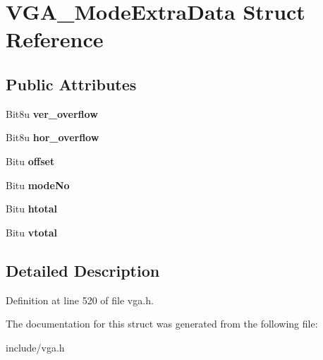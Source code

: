\hypertarget{structVGA__ModeExtraData}{\section{V\-G\-A\-\_\-\-Mode\-Extra\-Data Struct Reference}
\label{structVGA__ModeExtraData}
}
\subsection*{Public Attributes}
\begin{DoxyCompactItemize}
\item 
\hypertarget{structVGA__ModeExtraData_a020b5a995f7d52935b5e4fb5899fe72d}{Bit8u {\bfseries ver\-\_\-overflow}}\label{structVGA__ModeExtraData_a020b5a995f7d52935b5e4fb5899fe72d}

\item 
\hypertarget{structVGA__ModeExtraData_a60204db357ea608c5f03a8d59c80d3ff}{Bit8u {\bfseries hor\-\_\-overflow}}\label{structVGA__ModeExtraData_a60204db357ea608c5f03a8d59c80d3ff}

\item 
\hypertarget{structVGA__ModeExtraData_a11bba06bf4bcd5cb9aca1442e5d9b368}{Bitu {\bfseries offset}}\label{structVGA__ModeExtraData_a11bba06bf4bcd5cb9aca1442e5d9b368}

\item 
\hypertarget{structVGA__ModeExtraData_a4af1e6bf83f95024c09802255715702a}{Bitu {\bfseries mode\-No}}\label{structVGA__ModeExtraData_a4af1e6bf83f95024c09802255715702a}

\item 
\hypertarget{structVGA__ModeExtraData_a21c6015134a307927a2ab9915c2dfb41}{Bitu {\bfseries htotal}}\label{structVGA__ModeExtraData_a21c6015134a307927a2ab9915c2dfb41}

\item 
\hypertarget{structVGA__ModeExtraData_a9410324359daa0b31e4026d9e70aeae0}{Bitu {\bfseries vtotal}}\label{structVGA__ModeExtraData_a9410324359daa0b31e4026d9e70aeae0}

\end{DoxyCompactItemize}


\subsection{Detailed Description}


Definition at line 520 of file vga.\-h.



The documentation for this struct was generated from the following file\-:\begin{DoxyCompactItemize}
\item 
include/vga.\-h\end{DoxyCompactItemize}
